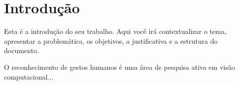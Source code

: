\documentclass[
	a4paper,      %
	12pt,         %
	english       %
]{abntex2}
\begin{document}
\tableofcontents* %


\textual

\chapter{Introdução}
Esta é a introdução do seu trabalho. Aqui você irá contextualizar o tema, apresentar a problemática, os objetivos, a justificativa e a estrutura do documento.

O reconhecimento de gestos humanos é uma área de pesquisa ativa em visão computacional...

\postextual


\end{document}
